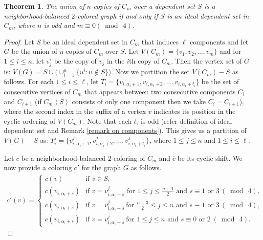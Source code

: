 \documentclass[12pt]{article}
\newtheorem{theorem}{Theorem}[section]
\begin{document}
\begin{theorem}\label{th: unionoverdepsetcycle}
    The union of $n$-copies of $C_m$ over a dependent set $S$ is a neighborhood-balanced $2$-colored graph if and only if $S$ is an ideal dependent set in $C_m$, where $n$ is odd and  $m\equiv 0 (\bmod\ 4)$.
\end{theorem}
\begin{proof}
    Let $S$ be an ideal dependent set in $C_m$ that induces $\ell$ components and let $G$ be the union of $n$-copies of $C_m$ over $S$.
    Let $V(C_m) = \{v_1, v_2,  \dots, v_m\}$ and for $1 \le i \le n$, let $v_j^i$ be the copy of $v_j$ in the $i$th copy of $C_m$.
    Then the vertex set of $G$ is: $V(G) = S \cup \big(\cup_{i=1}^n \{u^i :  u \notin S\}\big)$.
    Now we partition the set $V(C_m)-S$ as follows.
    For each $1 \le i \le \ell$, let $T_i = \{v_{i,\alpha_{i}+1}, v_{i,\alpha_{i}+2}, \dots, v_{i,\alpha_{i} + t_i}\}$ be the set of consecutive vertices of $C_m$ that appears between two consecutive components $C_i$ and $C_{i+1}$ (if $C_m\left<S\right>$ consists of only one component then we take $C_i=C_{i+1}$), where the second index in the suffix of a vertex $v$ indicates its position in the cyclic ordering of $V(C_m)$.
    Note that each $t_i$ is odd (refer definition of ideal dependent set and Remark \ref{remark on components}).
    This gives us a partition of $V(G)-S$ as: $T_{i}^{j} = \{v_{i,\alpha_{i}+1}^{j}, v_{i,\alpha_{i}+2}^{j},  \dots, v_{i,\alpha_{i} + t_i}^{j}\}$, where $ 1 \le j \le n$ and $1\leq i \leq \ell$.
   \par
    Let $c$ be a neighborhood-balanced $2$-coloring of $C_m$ and $\overline{c}$ be its cyclic shift.
    We now provide a coloring $c'$ for the graph $G$ as follows.
    \begin{align*}
        c'(v)=
        \begin{cases}
            c(v) &\text{if } v \in S,\\
            c(v_{i, \alpha_{i}+s}) &\text{if } v = v_{i, \alpha_{i} + s}^{j} \text{ for $1 \leq j \leq \frac{n+1}{2}$ and $s\equiv 1 \text{ or }3\  (\bmod\ 4)$},\\
            \overline{c}(v_{i,\alpha_i+s}) &\text{if } v = v_{i, \alpha_{i} + s}^{j}\  \text{for $\frac{n+3}{2}\leq j \leq n$ and $s\equiv 1\text{ or }3\ (\bmod\ 4)$},\\
            c(v_{i,\alpha_i+s}) &\text{if } v=v_{i, \alpha_{i} + s}^{j}\ \text{for $1\leq j \leq n$ and $s\equiv 0\text{ or }2\ (\bmod\ 4)$}.
        \end{cases}

\end{align*}
\end{proof}
\end{document}
